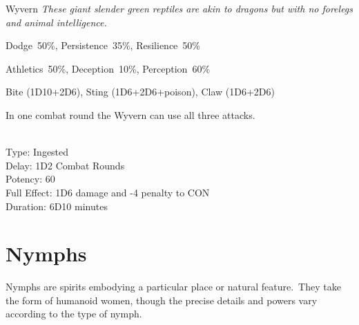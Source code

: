 \begin{monsterbox}{Wyvern}
	\textit{These giant slender green reptiles are akin to dragons but with no forelegs and animal intelligence.}\\
	\rpghline
	\basics[%
        hitpoints  = 23, 
	majorwound = 12,
	damagemodifier = +2D6,
	powerpoints = 10,
	movementrate = {23m, 30m when flying},
	armor = Scales (5AP),
	plunderrating = 1
	]
	\rpghline%
	\stats[ %
		STR = 4D6+12 (26),
		CON = 2D6+12 (19),
		DEX = 2D6+6  (13),
		SIZ = 4D6+12 (26),
		INT = 7      (7),
		POW = 3D6    (11),
		CHA = 6      (6)
	]
	\rpghline%
	\begin{rpg-monsteraction}[Resistances]
		Dodge~50\%, Persistence~35\%, Resilience~50\%
	\end{rpg-monsteraction}
	\begin{rpg-monsteraction}[Practical]
		Athletics~50\%, Deception~10\%, Perception~60\%
	\end{rpg-monsteraction}
	\begin{rpg-monsteraction}
		Bite (1D10+2D6), Sting (1D6+2D6+poison), Claw (1D6+2D6)
	\end{rpg-monsteraction}
	\begin{rpg-monsteraction}
		In one combat round the Wyvern can use all three attacks.	
	\end{rpg-monsteraction}
	\begin{rpg-monsteraction}
		\\Type: Ingested\\
		Delay: 1D2 Combat Rounds\\
                Potency: 60\\
		Full Effect: 1D6 damage and -4 penalty to CON\\
		Duration: 6D10 minutes
	\end{rpg-monsteraction}

\end{monsterbox}



\section{Nymphs}
Nymphs are spirits embodying a particular place or natural feature. They take the form of humanoid women, though the precise details and powers vary according to the type of nymph.


